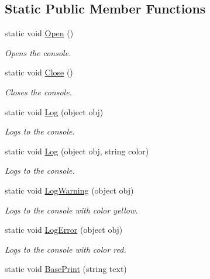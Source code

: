 \subsection*{Static Public Member Functions}
\begin{DoxyCompactItemize}
\item 
static void \hyperlink{class_developer_console_1_1_dev_console_a45deaa2419420ca87dbd424b1d5ad47f}{Open} ()
\begin{DoxyCompactList}\small\item\em Opens the console. \end{DoxyCompactList}\item 
static void \hyperlink{class_developer_console_1_1_dev_console_acda98316836e33329984b87b5b4ba0e2}{Close} ()
\begin{DoxyCompactList}\small\item\em Closes the console. \end{DoxyCompactList}\item 
static void \hyperlink{class_developer_console_1_1_dev_console_a1e1066a6536ffcb97b98fa0083dddc42}{Log} (object obj)
\begin{DoxyCompactList}\small\item\em Logs to the console. \end{DoxyCompactList}\item 
static void \hyperlink{class_developer_console_1_1_dev_console_a14fdb350c2590a23ec30fb80ccfced64}{Log} (object obj, string color)
\begin{DoxyCompactList}\small\item\em Logs to the console. \end{DoxyCompactList}\item 
static void \hyperlink{class_developer_console_1_1_dev_console_aad85b1607d48da07b04c2bf4417ac6bf}{Log\+Warning} (object obj)
\begin{DoxyCompactList}\small\item\em Logs to the console with color yellow. \end{DoxyCompactList}\item 
static void \hyperlink{class_developer_console_1_1_dev_console_a4756f307082a11bd36ce86637b8a8dfc}{Log\+Error} (object obj)
\begin{DoxyCompactList}\small\item\em Logs to the console with color red. \end{DoxyCompactList}\item 
static void \hyperlink{class_developer_console_1_1_dev_console_a1133667062aefe90b952db9a08e1ede5}{Base\+Print} (string text)

\end{DoxyCompactItemize}
